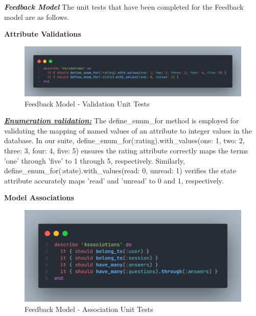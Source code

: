 \begin{justify}


\newendline \textbf{\textit{Feedback Model}}\newendline
The unit tests that have been completed for the Feedback model are as follows.

\vspace{0.25cm}
\newendline
\textbf{Attribute Validations}

    \begin{figure}[H]
        \centerline{\includegraphics[width=140mm,scale=1]{figures/implementation_and_testing/testing/AUT/feedback/validations.png}}
        \caption{Feedback Model - Validation Unit Tests}
        \label{Feedback Model - Validation Unit Tests}
    \end{figure}

\vspace{0.25cm}
\noindent\textbf{\textit{\underline{Enumeration validation:}}} The define\_enum\_for method is employed for validating the mapping of named values of an attribute to integer values in the database. In our suite, define\_enum\_for(:rating).with\_values(one: 1, two: 2, three: 3, four: 4, five: 5) ensures the rating attribute correctly maps the terms 'one' through 'five' to 1 through 5, respectively. Similarly, define\_enum\_for(:state).with\_values(read: 0, unread: 1) verifies the state attribute accurately maps 'read' and 'unread' to 0 and 1, respectively.

\vspace{0.25cm}
\newendline
\textbf{Model Associations}

    \begin{figure}[H]
        \centerline{\includegraphics[width=140mm,scale=1]{figures/implementation_and_testing/testing/AUT/feedback/associations.png}}
        \caption{Feedback Model - Association Unit Tests}
        \label{Feedback Model - Association Unit Tests}
    \end{figure}


\end{justify}
